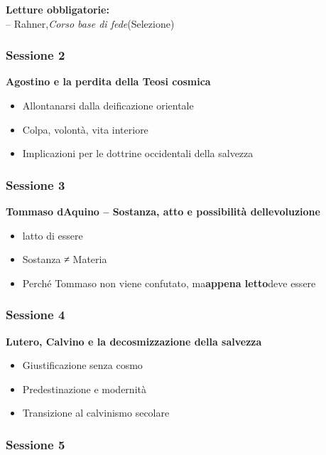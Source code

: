 \documentclass[
]{article}
\begin{document}
\textbf{Letture obbligatorie:\\
}-- Rahner,\emph{Corso base di fede}(Selezione)

\subsubsection{\texorpdfstring{\textbf{Sessione 2}}{Sessione 2}}\label{sessione-2}

\textbf{Agostino e la perdita della Teosi cosmica}

\begin{itemize}
\item
  Allontanarsi dalla deificazione orientale
\item
  Colpa, volontà, vita interiore
\item
  Implicazioni per le dottrine occidentali della salvezza
\end{itemize}

\subsubsection{\texorpdfstring{\textbf{Sessione 3}}{Sessione 3}}\label{sessione-3}

\textbf{Tommaso d\textquotesingle Aquino -- Sostanza, atto e possibilità dell\textquotesingle evoluzione}

\begin{itemize}
\item
  l\textquotesingle atto di essere
\item
  Sostanza ≠ Materia
\item
  Perché Tommaso non viene confutato, ma\textbf{appena letto}deve essere
\end{itemize}

\subsubsection{\texorpdfstring{\textbf{Sessione 4}}{Sessione 4}}\label{sessione-4}

\textbf{Lutero, Calvino e la decosmizzazione della salvezza}

\begin{itemize}
\item
  Giustificazione senza cosmo
\item
  Predestinazione e modernità
\item
  Transizione al calvinismo secolare
\end{itemize}

\subsubsection{\texorpdfstring{\textbf{Sessione 5}}{Sessione 5}}\label{sessione-5}
\end{document}
